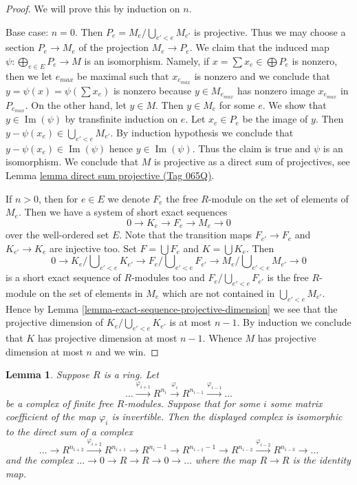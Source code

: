 \documentclass{amsart}
\theoremstyle{plain}
\newtheorem{lemma}[subsection]{Lemma}
\theoremstyle{definition}
\theoremstyle{remark}
\numberwithin{equation}{subsection}
\def\Im{\mathop{\mathrm{Im}}}
\begin{document}
\begin{proof}
We will prove this by induction on $n$.

\medskip\noindent
Base case: $n = 0$. Then $P_e = M_e/\bigcup_{e' < e} M_{e'}$ is projective.
Thus we may choose a section $P_e \to M_e$ of the projection $M_e \to P_e$.
We claim that the induced map $\psi : \bigoplus_{e \in E} P_e \to M$ is an
isomorphism. Namely, if $x = \sum x_e \in \bigoplus P_e$ is nonzero,
then we let $e_{max}$ be maximal such that $x_{e_{max}}$ is nonzero
and we conclude that $y = \psi(x) = \psi(\sum x_e)$ is nonzero because
$y \in M_{e_{max}}$ has nonzero image $x_{e_{max}}$ in $P_{e_{max}}$.
On the other hand, let $y \in M$. Then $y \in M_e$ for some $e$.
We show that $y \in \Im(\psi)$ by transfinite induction on $e$.
Let $x_e \in P_e$ be the image of $y$. Then
$y - \psi(x_e) \in \bigcup_{e' < e} M_{e'}$.
By induction hypothesis we conclude that $y - \psi(x_e) \in \Im(\psi)$
hence $y \in \Im(\psi)$. Thus the claim is true and
$\psi$ is an isomorphism. We conclude that $M$ is projective as
a direct sum of projectives, see
Lemma \href{https://stacks.math.columbia.edu/tag/065Q}{lemma direct sum projective (Tag 065Q)}.

\medskip\noindent
If $n > 0$, then for $e \in E$ we denote $F_e$ the free $R$-module
on the set of elements of $M_e$. Then we have a system of
short exact sequences
$$
0 \to K_e \to F_e \to M_e \to 0
$$
over the well-ordered set $E$. Note that the transition maps
$F_{e'} \to F_e$ and $K_{e'} \to K_e$ are injective too.
Set $F = \bigcup F_e$ and $K = \bigcup K_e$. Then
$$
0 \to
K_e/\bigcup\nolimits_{e' < e} K_{e'} \to
F_e/\bigcup\nolimits_{e' < e} F_{e'} \to
M_e/\bigcup\nolimits_{e' < e} M_{e'} \to 0
$$
is a short exact sequence of $R$-modules too and
$F_e/\bigcup_{e' < e} F_{e'}$ is the free $R$-module on the
set of elements in $M_e$ which are not contained in $\bigcup_{e' < e} M_{e'}$.
Hence by
Lemma \ref{lemma-exact-sequence-projective-dimension}
we see that the projective dimension of $K_e/\bigcup_{e' < e} K_{e'}$
is at most $n - 1$. By induction we conclude that $K$ has projective
dimension at most $n - 1$. Whence $M$ has projective dimension at most
$n$ and we win.
\end{proof}


\begin{lemma}
\label{lemma-add-trivial-complex}
Suppose $R$ is a ring. Let
$$
\ldots
\xrightarrow{\varphi_{i + 1}}
R^{n_i}
\xrightarrow{\varphi_i}
R^{n_{i-1}}
\xrightarrow{\varphi_{i-1}}
\ldots
$$
be a complex of finite free $R$-modules. Suppose that for some $i$
some matrix coefficient of the map $\varphi_i$ is invertible.
Then the displayed complex is isomorphic to the direct sum of a complex
$$
\ldots \to
R^{n_{i + 2}} \xrightarrow{\varphi_{i + 2}}
R^{n_{i + 1}} \to
R^{n_i - 1} \to
R^{n_{i - 1} - 1} \to
R^{n_{i - 2}} \xrightarrow{\varphi_{i - 2}}
R^{n_{i - 3}} \to
\ldots
$$
and the complex $\ldots \to 0 \to R \to R \to 0 \to \ldots$
where the map $R \to R$ is the identity map.
\end{lemma}
\end{document}
